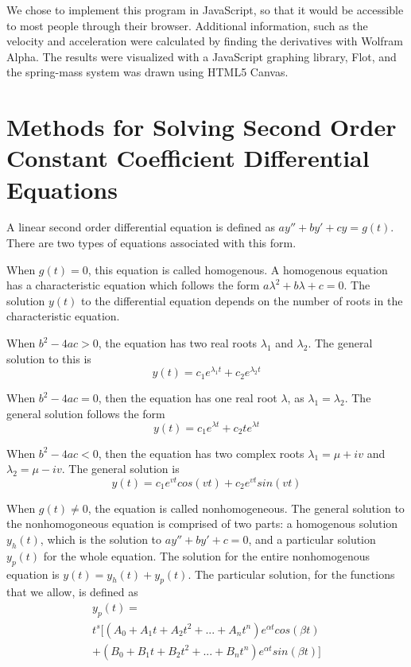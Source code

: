 \documentclass[11pt]{article} %
\begin{document}
\begin{multicols}{2}
We chose to implement this program in JavaScript, so that it would be accessible to most people through their browser. Additional information, such as the velocity and acceleration were calculated by finding the derivatives with Wolfram Alpha. The results were visualized with a JavaScript graphing library, Flot, and the spring-mass system was drawn using HTML5 Canvas.

\section {Methods for Solving Second Order Constant Coefficient Differential Equations}

A linear second order differential equation is defined as $ay'' + by' + cy = g(t)$. There are two types of equations associated with this form.

When $g(t) = 0$, this equation is called homogenous. A homogenous equation has a characteristic equation which follows the form $a\lambda^2 + b\lambda + c = 0$. The solution $y(t)$ to the differential equation depends on the number of roots in the characteristic equation.

When $b^2 - 4ac > 0$, the equation has two real roots $\lambda_1$ and $\lambda_2$. The general solution to this is
\begin{equation}\label{eq:two_real_roots}
y(t) = c_1e^{\lambda_1t} + c_2e^{\lambda_2t}
\end{equation}

When $b^2 - 4ac = 0$, then the equation has one real root $\lambda$, as $\lambda_1 = \lambda_2$. The general solution follows the form
\begin{equation}\label{eq:one_real_root}
y(t) = c_1e^{{\lambda}t} + c_2te^{{\lambda}t}
\end{equation}

When $b^2 - 4ac < 0$, then the equation has two complex roots $\lambda_1 = \mu + iv$ and $\lambda_2 = \mu - iv$. The general solution is 
\begin{equation}\label{eq:two_complex_roots}
y(t) = c_1e^{vt}cos(vt) + c_2e^{vt}sin(vt)
\end{equation}

When $g(t) \neq 0$, the equation is called nonhomogeneous. The general solution to the nonhomogoneous equation is comprised of two parts: a homogenous solution $y_h(t)$, which is the solution to $ay'' + by' + c = 0$, and a particular solution $y_p(t)$ for the whole equation. The solution for the entire nonhomogenous equation is $y(t) = y_h(t) + y_p(t)$. The particular solution, for the functions that we allow, is defined as
\begin{equation}\label{eq:generalized}
\begin{split}
y_p(t)=\\t^s[(A_0 + A_1t + A_2t^2 + ... + A_nt^n)e^{{\alpha}t}cos({\beta}t)\\+ (B_0 + B_1t + B_2t^2 + ... + B_nt^n)e^{{\alpha}t}sin({\beta}t)]
\end{split}
\end{equation}


\end{multicols}
\end{document}
